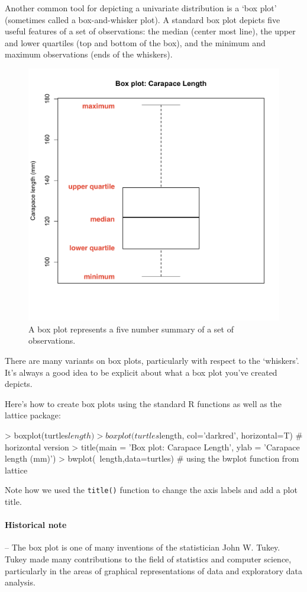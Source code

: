 Another common tool for depicting a univariate distribution is a `box
plot' (sometimes called a box-and-whisker plot). A standard box plot
depicts five useful features of a set of observations: the median
(center most line), the upper and lower quartiles (top and bottom of the
box), and the minimum and maximum observations (ends of the whiskers).

\begin{figure}[htbp]
\centering
\includegraphics[width=0.5\columnwidth]{./figures/hands-on2/boxplot-labeled.pdf}
\caption{A box plot represents a five number summary of a set of
observations.}
\end{figure}

There are many variants on box plots, particularly with respect to the
`whiskers'. It's always a good idea to be explicit about what a box plot
you've created depicts.

Here's how to create box plots using the standard R functions as well as
the lattice package:

\begin{R}
> boxplot(turtles$length)
> boxplot(turtles$length, col='darkred', horizontal=T) # horizontal version 
> title(main = 'Box plot: Carapace Length', ylab = 'Carapace length (mm)')
> bwplot(~length,data=turtles) # using the bwplot function from lattice
\end{R}
Note how we used the \lstinline!title()! function to change the axis
labels and add a plot title.

\paragraph{Historical note}

-- The box plot is one of many inventions of the statistician John W.
Tukey. Tukey made many contributions to the field of statistics and
computer science, particularly in the areas of graphical representations
of data and exploratory data analysis.

